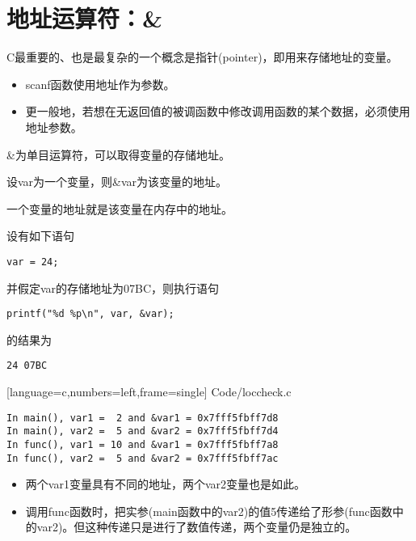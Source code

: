 \section{地址运算符：\&}
\begin{frame}[fragile]\ft{\secname}
C最重要的、也是最复杂的一个概念是指针(pointer)，即\textcolor{acolor1}{用来存储地址的变量}。

\end{frame}

\begin{frame}[fragile]\ft{\secname}
\begin{itemize}
\item
scanf函数使用地址作为参数。\\[0.1in]
\item
更一般地，若想在无返回值的被调函数中修改调用函数的某个数据，必须使用地址参数。
\end{itemize}
\end{frame}

\begin{frame}[fragile]\ft{\secname}
\&为单目运算符，可以取得变量的存储地址。 
\pause 
\vspace{0.4in}

设var为一个变量，则\&var为该变量的地址。

\vspace{0.1in}

\textcolor{acolor1}{一个变量的地址就是该变量在内存中的地址。} 

\end{frame}

\begin{frame}[fragile]\ft{\secname}
设有如下语句
\begin{lstlisting}
var = 24;
\end{lstlisting}
并假定var的存储地址为07BC，则执行语句
\begin{lstlisting}
printf("%d %p\n", var, &var);
\end{lstlisting}
的结果为
\begin{lstlisting}
24 07BC
\end{lstlisting}
\end{frame}

\begin{frame}\ft{\secname}
  
  [language=c,numbers=left,frame=single]
  {Code/loccheck.c}
\end{frame}


\begin{frame}[fragile]\ft{\secname}
\begin{lstlisting}[backgroundcolor=\color{red!10}]
In main(), var1 =  2 and &var1 = 0x7fff5fbff7d8
In main(), var2 =  5 and &var2 = 0x7fff5fbff7d4
In func(), var1 = 10 and &var1 = 0x7fff5fbff7a8
In func(), var2 =  5 and &var2 = 0x7fff5fbff7ac
\end{lstlisting}
\end{frame}

\begin{frame}[fragile]\ft{\secname}
\begin{itemize}
\item 两个{\tf var1}变量具有不同的地址，两个{\tf var2}变量也是如此。\\[0.1in]
\item 调用{\tf func}函数时，把实参({\tf main}函数中的{\tf var2})的值5传递给了形参({\tf func}函数中的{\tf var2})。但这种传递只是进行了数值传递，两个变量仍是独立的。
\end{itemize}
\end{frame}


